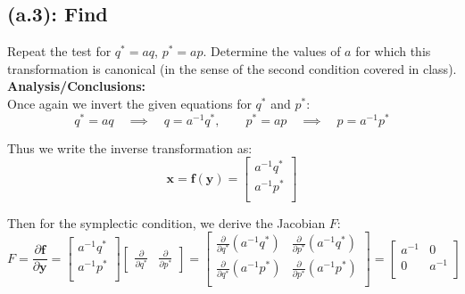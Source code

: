 \documentclass[titlepage]{article}
\begin{document}
\subsection*{(a.3): Find}

Repeat the test for $q^*=aq$, $p^*=ap$. Determine the values of $a$ for which this transformation is canonical (in the sense of the second condition covered in class). \\

\textbf{Analysis/Conclusions:}\\

Once again we invert the given equations for $q^*$ and $p^*$:
\begin{equation}
	q^*=aq\quad\implies\quad q=a^{-1}q^*,\qquad p^*=ap\quad\implies\quad p=a^{-1}p^*
\end{equation}

\begin{mdframed}[linewidth=1pt, innertopmargin=10pt, innerbottommargin=10pt]
	Thus we write the inverse transformation as:
	\begin{equation}
		\boldsymbol{x}=\boldsymbol{f}(\boldsymbol{y})=
		\begin{bmatrix}
			a^{-1}q^* \\
			a^{-1}p^* \\
		\end{bmatrix}
	\end{equation}
\end{mdframed}

Then for the symplectic condition, we derive the Jacobian $F$:
\begin{equation}
	F=\frac{\partial\boldsymbol{f}}{\partial\boldsymbol{y}}=
	\begin{bmatrix}
		a^{-1}q^* \\
		a^{-1}p^* \\
	\end{bmatrix}
	\begin{bmatrix}
		\frac{\partial}{\partial q^*} & \frac{\partial}{\partial p^*}
	\end{bmatrix}=
	\begin{bmatrix}
		\frac{\partial}{\partial q^*}\left(a^{-1}q^*\right) & \frac{\partial}{\partial p^*}\left(a^{-1}q^*\right) \\
		\frac{\partial}{\partial q^*}\left(a^{-1}p^*\right) & \frac{\partial}{\partial p^*}\left(a^{-1}p^*\right) \\
	\end{bmatrix}=
	\begin{bmatrix}
		a^{-1} & 0 \\
		0 & a^{-1} \\
	\end{bmatrix}
\end{equation}
\end{document}
